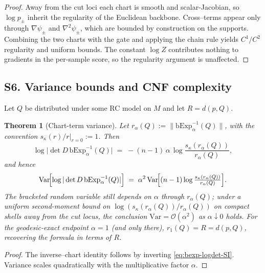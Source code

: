 \documentclass{article}
\newcommand{\Var}{\mathrm{Var}}
\newtheorem{theorem}{Theorem}
\theoremstyle{definition}
\theoremstyle{remark}
\newcommand{\bExp}{\mathrm{bExp}}
\begin{document}
\begin{proof}
Away from the cut loci each chart is smooth and scalar-Jacobian, so $\log p_\pm$ inherit the
regularity of the Euclidean backbone. Cross--terms appear only through $\nabla\psi_\pm$ and
$\nabla^2\psi_\pm$, which are bounded by construction on the supports. Combining the two charts
with the gate and applying the chain rule yields $C^1/C^2$ regularity and uniform bounds. The constant $\log Z$ contributes nothing to gradients in the per-sample score,
so the regularity argument is unaffected.
\end{proof}

\subsection*{S6. Variance bounds and CNF complexity}

Let $Q$ be distributed under some RC model on $M$ and let $R=d(p,Q)$.

\begin{theorem}[Chart-term variance]
\label{thm:chart-variance-supp}
Let $r_\alpha(Q):=\|\bExp_\alpha^{-1}(Q)\|$, with the convention
$s_\kappa(r)/r\big|_{r=0}:=1$. Then
\[
\log\bigl|\det D\,\bExp_\alpha^{-1}(Q)\bigr|
\;=\;-(n-1)\,\alpha\,\log\frac{s_\kappa(r_\alpha(Q))}{r_\alpha(Q)},
\]
and hence
\[
\Var\!\Bigl[\log|\det D\,\bExp_\alpha^{-1}(Q)|\Bigr]
\;=\;\alpha^2\,\Var\!\Bigl[(n-1)\log\tfrac{s_\kappa(r_\alpha(Q))}{r_\alpha(Q)}\Bigr].
\]
The bracketed random variable still depends on $\alpha$ through $r_\alpha(Q)$;
under a uniform second-moment bound on
$\log(s_\kappa(r_\alpha(Q))/r_\alpha(Q))$ on compact shells away from the cut
locus, the conclusion $\Var=\mathcal O(\alpha^2)$ as $\alpha\downarrow 0$
holds. For the geodesic-exact endpoint $\alpha=1$ (and only there),
$r_1(Q)=R=d(p,Q)$, recovering the formula in terms of $R$.
\end{theorem}

\begin{proof}
The inverse--chart identity follows by inverting \eqref{eq:bexp-logdet-SI}. Variance scales
quadratically with the multiplicative factor $\alpha$.
\end{proof}
\end{document}
